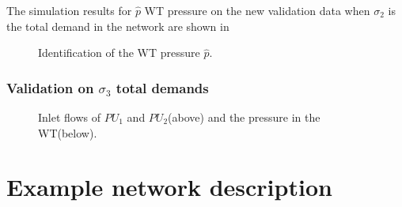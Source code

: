 \vspace{-4mm}

 The simulation results for $\hat{p}$ WT pressure on the new validation data when $\sigma_2$ is the total demand in the network are shown in 

 \begin{figure}[H]
 \centering
  
 \vspace{-2.5mm}
 \caption{Identification of the WT pressure $\hat{p}$.}
 \label{fig:WT_ident_sigma2}
 \end{figure}

 \vspace{-4mm}


\subsection{Validation on $\sigma_3$ total demands}
 \label{validation_sigma2}


\vspace{-2mm}

 \begin{figure}[H]
 \centering
  
 \vspace{-2.5mm}
 \label{fig:dk_sigma3}
 \end{figure}

 \vspace{-6.5mm}

 \begin{figure}[H]
 \centering
 \hspace{-3.5mm}
  
 \vspace{-2.5mm}
 \caption{Inlet flows of $PU_1$ and $PU_2$(above) and the pressure in the WT(below).}
 \label{fig:WT_sigma3}
 \end{figure}

 \vspace{-3mm}


\chapter{Example network description}
\label{physical_properties_example1}

